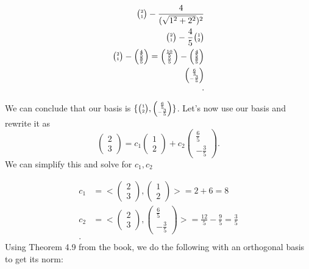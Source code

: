 \begin{align*}
    \SmallMatrix{2\\1}-\frac{4}{(\sqrt{1^2+2^2} )^2}\\
    \SmallMatrix{2\\1} - \frac{4}{5}\SmallMatrix{1\\2}\\
    \SmallMatrix{2\\1}-\SmallMatrix{\frac{4}{5}\\\frac{8}{5}}=\SmallMatrix{\frac{10}{5}\\\frac{5}{5}}-\SmallMatrix{\frac{4}{5}\\\frac{8}{5}}\\
    \SmallMatrix{\frac{6}{3}\\-\frac{3}{5}}\\
  .\end{align*}

  We can conclude that our basis is $\{\SmallMatrix{1\\2},\SmallMatrix{\frac{6}{5}\\-\frac{3}{5}}\}$. Let's now use our basis and rewrite it as
  \[
  \begin{pmatrix} 2\\3 \end{pmatrix} =c_1\begin{pmatrix} 1\\2 \end{pmatrix} +c_2\begin{pmatrix} \frac{6}{5}\\-\frac{3}{5} \end{pmatrix} 
  .\] 
  We can simplify this and solve for $c_1,c_2$

  \begin{align*}
    c_1&=<\begin{pmatrix} 2\\3 \end{pmatrix} ,\begin{pmatrix} 1\\2 \end{pmatrix}> = 2+6=8\\
    c_2&=<\begin{pmatrix} 2\\3 \end{pmatrix} ,\begin{pmatrix} \frac{6}{5}\\-\frac{3}{5} \end{pmatrix}> = \frac{12}{5}-\frac{9}{5}=\frac{3}{5}\\
  .\end{align*}
  Using Theorem 4.9 from the book, we do the following with an orthogonal basis to get its norm:

